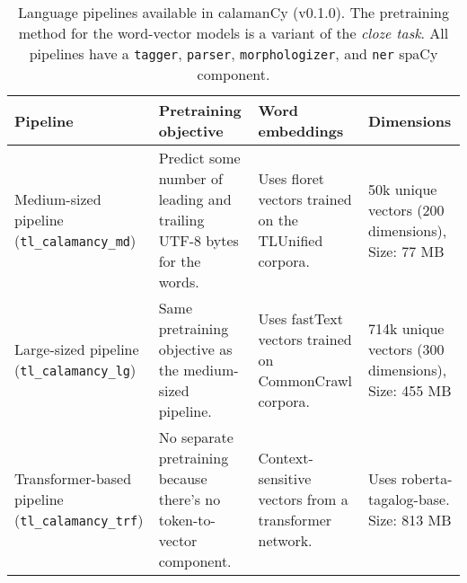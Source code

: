 \documentclass[../emnlp2023.tex]{subfiles}
\begin{document}
\begin{table*}[t]
\begin{tabular}{@{}p{3cm}p{4cm}p{4cm}p{3.75cm}@{}}
\toprule
Pipeline  &  Pretraining objective & Word embeddings & Dimensions \\ \midrule
Medium-sized pipeline (\texttt{tl\_calamancy\_md}) & Predict some number of leading and trailing UTF-8 bytes for the words. & Uses floret vectors trained on the TLUnified corpora. & 50k unique vectors (200 dimensions), Size: 77 MB\\
Large-sized pipeline (\texttt{tl\_calamancy\_lg})  & Same pretraining objective as the medium-sized pipeline.    & Uses fastText vectors trained on CommonCrawl corpora.                  & 714k unique vectors (300 dimensions), Size: 455 MB \\
Transformer-based pipeline (\texttt{tl\_calamancy\_trf}) & No separate pretraining because there's no token-to-vector component. & Context-sensitive vectors from a transformer network.      & Uses roberta-tagalog-base. Size: 813 MB  \\ \bottomrule
\end{tabular}
\caption{
    Language pipelines available in calamanCy (v0.1.0).
    The pretraining method for the word-vector models is a variant of the \textit{cloze task}.
    All pipelines have a \texttt{tagger}, \texttt{parser}, \texttt{morphologizer}, and \texttt{ner} spaCy component.
}
\label{table:calamancy_pipelines}
\end{table*}
\end{document}
